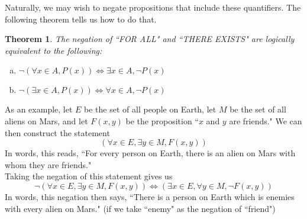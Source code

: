 \documentclass[12pt]{article}
\renewcommand{\_}[1]{\underline{ #1 }}
\newtheorem{theorem}{\color{navy}Theorem}
\theoremstyle{definition}
\numberwithin{equation}{subsection}
\begin{document}
\bigskip

Naturally, we may wish to negate propositions that include these quantifiers. The following theorem tells us how to do that.


\begin{theorem}
    The negation of ``FOR ALL" and ``THERE EXISTS" are logically equivalent to the following:
    \begin{enumerate}[(a)]
    \item $\neg(\forall x\in A, P(x)) \Longleftrightarrow \exists x\in A, \neg P(x)$
    \item $\neg(\exists x\in A, P(x)) \Longleftrightarrow \forall x\in A, \neg P(x)$
    \end{enumerate}
\end{theorem}

As an example, let $E$ be the set of all people on Earth, let $M$ be the set of all aliens on Mars, and let $F(x,y)$ be the proposition ``$x$ and $y$ are friends." We can then construct the statement
$$
    (\forall x\in E, \exists y\in M, F(x,y))
$$
In words, this reads, ``For every person on Earth, there is an alien on Mars with whom they are friends."\\

Taking the negation of this statement gives us
$$
    \neg(\forall x\in E, \exists y\in M, F(x,y)) \Longleftrightarrow (\exists x\in E, \forall y\in M, \neg F(x,y))
$$
In words, this negation then says, ``There is a person on Earth which is enemies with every alien on Mars." (if we take ``enemy" as the negation of ``friend")
\end{document}
